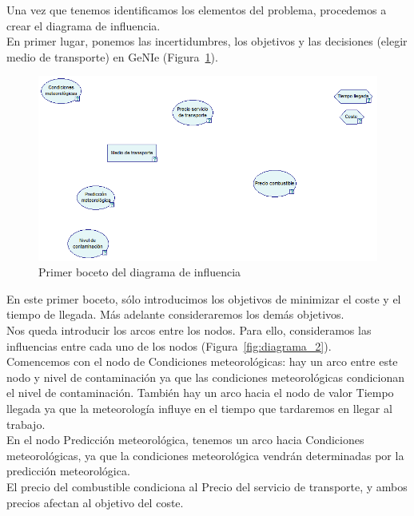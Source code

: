 \documentclass[12pt,a4paper,twoside,openright,titlepage,final]{article}
\begin{document}
Una vez que tenemos identificamos los elementos del problema, procedemos a crear el diagrama de influencia.\\

En primer lugar, ponemos las incertidumbres, los objetivos y las decisiones (elegir medio de transporte) en GeNIe (Figura~\ref{fig:diagrama_1}).\\
 

\begin{figure}[tbph!]
\centering
\includegraphics[width=0.9\linewidth]{imagenes/diagrama_1}
\caption{Primer boceto del diagrama de influencia}
\label{fig:diagrama_1}
\end{figure}

En este primer boceto, sólo introducimos los objetivos de minimizar el coste y el tiempo de llegada. Más adelante consideraremos los demás objetivos.\\

Nos queda introducir los arcos entre los nodos. Para ello, consideramos las influencias entre cada uno de los nodos (Figura~\ref{fig:diagrama_2}).\\

Comencemos con el nodo de Condiciones meteorológicas: hay un arco entre este nodo y nivel de contaminación ya que las condiciones meteorológicas condicionan el nivel de contaminación. También hay un arco hacia el nodo de valor Tiempo llegada ya que la meteorología influye en el tiempo que tardaremos en llegar al trabajo.\\

En el nodo Predicción meteorológica, tenemos un arco hacia Condiciones meteorológicas, ya que la condiciones meteorológica vendrán determinadas por la predicción meteorológica.\\

El precio del combustible condiciona al Precio del servicio de transporte, y ambos precios afectan al objetivo del coste.\\
\end{document}
